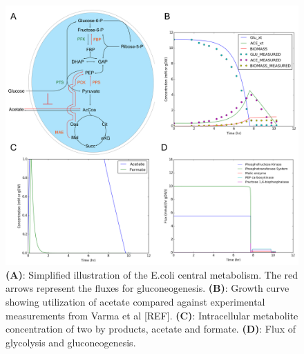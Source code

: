 \documentclass[12pt]{article}
\begin{document}
\clearpage
\begin{figure}[h]
\centering
\includegraphics[width=1.0\textwidth]{./Figures/Figure4_Ecoli.pdf}
\caption{\textbf{(A)}: Simplified illustration of the E.coli central metabolism. The red arrows represent the fluxes for gluconeogenesis. \textbf{(B)}: Growth curve showing utilization of acetate compared against experimental measurements from Varma et al [REF]. \textbf{(C)}: Intracellular metabolite concentration of two by products, acetate and formate. \textbf{(D)}: Flux of glycolysis and gluconeogenesis.
}\label{fig4-Ecoli}
\end{figure}

\clearpage

\clearpage

\renewcommand\thefigure{S\arabic{figure}}
\renewcommand\thetable{T\arabic{table}}
\renewcommand\thepage{S-\arabic{page}}
\renewcommand\theequation{S\arabic{equation}}

\setcounter{equation}{0}
\setcounter{table}{0}
\setcounter{figure}{0}
\setcounter{page}{1}


\end{document}
